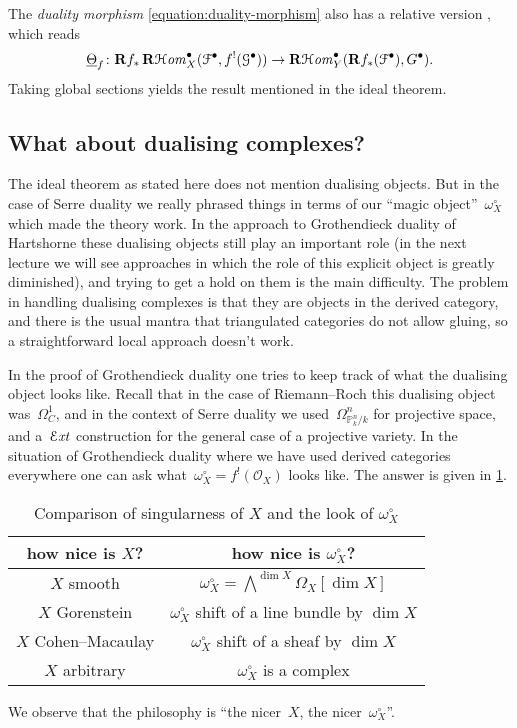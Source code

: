 \documentclass[10pt,a4paper]{article}
\begin{document}
\begin{remark}
  The \emph{duality morphism} \eqref{equation:duality-morphism} also has a relative version \cite[3.4.4]{conrad-grothendieck-duality-and-base-change}, which reads
  \begin{equation}
    \underline{\Theta}_f\colon\mathbf{R} f_*\operatorname{\mathbf{R}\mathcal{H}\mathit{om}}_X^\bullet(\mathcal{F}^\bullet,f^!(\mathcal{G}^\bullet))\to\operatorname{\mathbf{R}\mathcal{H}\mathit{om}}_Y^\bullet(\mathbf{R} f_*(\mathcal{F}^\bullet),G^\bullet).
  \end{equation}
  Taking global sections yields the result mentioned in the ideal theorem.
\end{remark}

\subsection{What about dualising complexes?}
The ideal theorem as stated here does not mention dualising objects. But in the case of Serre duality we really phrased things in terms of our ``magic object''~$\omega_X^\circ$ which made the theory work. In the approach to Grothendieck duality of Hartshorne these dualising objects still play an important role (in the next lecture we will see approaches in which the role of this explicit object is greatly diminished), and trying to get a hold on them is the main difficulty. The problem in handling dualising complexes is that they are objects in the derived category, and there is the usual mantra that triangulated categories do not allow gluing, so a straightforward local approach doesn't work.

In the proof of Grothendieck duality one tries to keep track of what the dualising object looks like. Recall that in the case of Riemann--Roch this dualising object was~$\Omega_C^1$, and in the context of Serre duality we used~$\Omega_{\mathbb{P}_k^n/k}^n$ for projective space, and a~$\operatorname{\mathcal{E}\mathit{xt}}$ construction for the general case of a projective variety. In the situation of Grothendieck duality where we have used derived categories everywhere one can ask what~$\omega_X^\circ=f^!(\mathcal{O}_X)$ looks like. The answer is given in \cref{table:comparison-X-dualising-sheaf}.

\begin{table}[p]
  \centering
  \begin{tabular}{cc}
    \toprule
    how nice is $X$? & how nice is $\omega_X^\circ$? \\\midrule
    $X$ smooth & $\omega_X^\circ=\bigwedge^{\dim X}\Omega_X[\dim X]$ \\
    $X$ Gorenstein & $\omega_X^\circ$ shift of a line bundle by $\dim X$ \\
    $X$ Cohen--Macaulay & $\omega_X^\circ$ shift of a sheaf by $\dim X$ \\
    $X$ arbitrary & $\omega_X^\circ$ is a complex \\
    \bottomrule
  \end{tabular}
  \caption{Comparison of singularness of $X$ and the look of $\omega_X^\circ$}
  \label{table:comparison-X-dualising-sheaf}
\end{table}

We observe that the philosophy is ``the nicer~$X$, the nicer~$\omega_X^\circ$''.



\printbibliography
\end{document}
